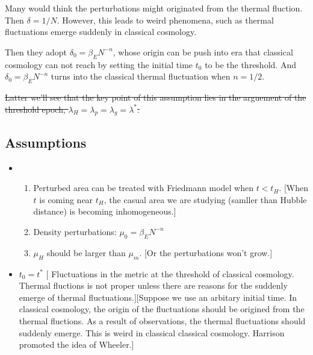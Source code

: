 \documentclass{article}
\begin{document}
Many would think the perturbations might originated from the thermal fluction. Then $\delta=1/N$. However, this leads to weird phenomena, such as thermal fluctuations emerge suddenly in classical cosmology.

Then they adopt $\delta_0=\beta_E N^{-n}$, whose origin can be push into era that classical cosmology can not reach by setting the initial time $t_0$ to be the threshold. And $\delta_0=\beta_E N^{-n}$ turns into the classical thermal fluctuation when $n=1/2$.

\sout{Latter we'll see that the key point of this assumption lies in the arguement of the threshold epoch, $\lambda_H=\lambda_p=\lambda_g =\lambda^*$.
}






\subsection{Assumptions}

\begin{itemize}




\item
\begin{enumerate}

\item Perturbed area can be treated with Friedmann model when $t<t_H$. [When $t$ is coming near $t_H$, the casual area we are studying (samller than Hubble distance) is becoming inhomogeneous.]

\item Density perturbations: $\mu_0=\beta_E N^{-n}$

\item $\mu_H$ should be larger than $\mu_m$. [Or the perturbations won't grow.]

\end{enumerate}

\item
$t_0=t^*$ [
Fluctuations in the metric at the threshold of classical cosmology. Thermal fluctions is not proper unless there are reasons for the suddenly emerge of thermal fluctuations.][Suppose we use an arbitary initial time. In classical cosmology, the origin of the fluctuations should be origined from the thermal fluctions. As a result of observations, the thermal fluctuations should suddenly emerge. This is weird in classical classical cosmology. Harrison promoted the idea of Wheeler.]


\end{itemize}
\end{document}
